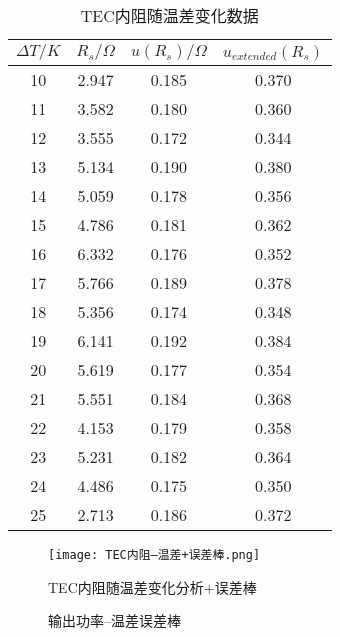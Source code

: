 \documentclass[dvipsnames, svgnames,a4paper,11pt]{article}
\begin{document}
        \begin{table}[htbp]
            \centering
            \begin{tabular}{|cc|cc|} 
            \hline
            $\Delta T/K$ & $R_s/\Omega$ & $u(R_s)/\Omega$ & $u_{extended}(R_s)$  \\ 
            \hline
            10   & 2.947       & 0.185   & 0.370      \\
            11   & 3.582       & 0.180   & 0.360      \\
            12   & 3.555       & 0.172   & 0.344      \\
            13   & 5.134       & 0.190   & 0.380      \\
            14   & 5.059       & 0.178   & 0.356      \\
            15   & 4.786       & 0.181   & 0.362      \\
            16   & 6.332       & 0.176   & 0.352      \\
            17   & 5.766       & 0.189   & 0.378      \\
            18   & 5.356       & 0.174   & 0.348      \\
            19   & 6.141       & 0.192   & 0.384      \\
            20   & 5.619       & 0.177   & 0.354      \\
            21   & 5.551       & 0.184   & 0.368      \\
            22   & 4.153       & 0.179   & 0.358      \\
            23   & 5.231       & 0.182   & 0.364      \\
            24   & 4.486       & 0.175   & 0.350      \\
            25   & 2.713       & 0.186   & 0.372      \\
            \hline
            \end{tabular}
            \caption{TEC内阻随温差变化数据}
            \label{tbl:TEC内阻随温差变化数据}
        \end{table}

        \begin{figure}[htbp]
            \centering
            \texttt{[image: TEC内阻--温差+误差棒.png]}
            \caption{TEC内阻随温差变化分析+误差棒}
            \label{fig:TEC内阻随温差变化分析+误差棒}
        \end{figure}

        


        \begin{figure}[htbp]
            \centering
            \hfill
            \caption{输出功率--温差误差棒}
            \label{fig:输出功率--温差}
        \end{figure}
\end{document}
